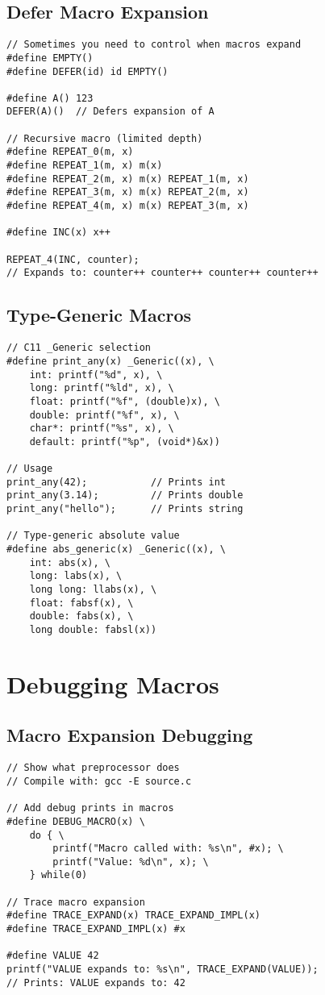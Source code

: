 \subsection{Defer Macro Expansion}

\begin{lstlisting}
// Sometimes you need to control when macros expand
#define EMPTY()
#define DEFER(id) id EMPTY()

#define A() 123
DEFER(A)()  // Defers expansion of A

// Recursive macro (limited depth)
#define REPEAT_0(m, x)
#define REPEAT_1(m, x) m(x)
#define REPEAT_2(m, x) m(x) REPEAT_1(m, x)
#define REPEAT_3(m, x) m(x) REPEAT_2(m, x)
#define REPEAT_4(m, x) m(x) REPEAT_3(m, x)

#define INC(x) x++

REPEAT_4(INC, counter);
// Expands to: counter++ counter++ counter++ counter++
\end{lstlisting}

\subsection{Type-Generic Macros}

\begin{lstlisting}
// C11 _Generic selection
#define print_any(x) _Generic((x), \
    int: printf("%d", x), \
    long: printf("%ld", x), \
    float: printf("%f", (double)x), \
    double: printf("%f", x), \
    char*: printf("%s", x), \
    default: printf("%p", (void*)&x))

// Usage
print_any(42);           // Prints int
print_any(3.14);         // Prints double
print_any("hello");      // Prints string

// Type-generic absolute value
#define abs_generic(x) _Generic((x), \
    int: abs(x), \
    long: labs(x), \
    long long: llabs(x), \
    float: fabsf(x), \
    double: fabs(x), \
    long double: fabsl(x))
\end{lstlisting}

\section{Debugging Macros}

\subsection{Macro Expansion Debugging}

\begin{lstlisting}
// Show what preprocessor does
// Compile with: gcc -E source.c

// Add debug prints in macros
#define DEBUG_MACRO(x) \
    do { \
        printf("Macro called with: %s\n", #x); \
        printf("Value: %d\n", x); \
    } while(0)

// Trace macro expansion
#define TRACE_EXPAND(x) TRACE_EXPAND_IMPL(x)
#define TRACE_EXPAND_IMPL(x) #x

#define VALUE 42
printf("VALUE expands to: %s\n", TRACE_EXPAND(VALUE));
// Prints: VALUE expands to: 42
\end{lstlisting}


